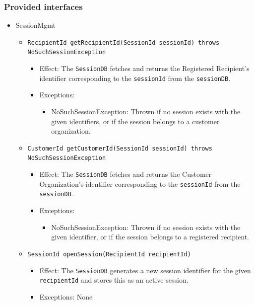 \documentclass[a4paper,10pt]{article}
\begin{document}
\subsubsection*{Provided interfaces}
\begin{itemize}
    \item SessionMgmt
    \begin{itemize}
        \item \texttt{RecipientId getRecipientId(SessionId sessionId) throws NoSuchSessionException}
        \begin{itemize}
            \item Effect: The \texttt{SessionDB} fetches and returns the Registered Recipient's identifier corresponding to the \texttt{sessionId} from the \texttt{sessionDB}.
            \item Exceptions:
            \begin{itemize}
                \item NoSuchSessionException: Thrown if no session exists with the given identifiers, or if the session belongs to a customer organization.
            \end{itemize}
		\end{itemize}
		
        \item \texttt{CustomerId getCustomerId(SessionId sessionId) throws NoSuchSessionException}
        \begin{itemize}
             \item Effect: The \texttt{SessionDB} fetches and returns the Customer Organization's identifier corresponding to the \texttt{sessionId} from the \texttt{sessionDB}.
             \item Exceptions:
             \begin{itemize}
                \item NoSuchSessionException: Thrown if no session exists with the given identifier, or if the session belongs to a registered recipient.
             \end{itemize}
        \end{itemize}
        
        \item \texttt{SessionId openSession(RecipientId recipientId)}
        \begin{itemize}
             \item Effect: The \texttt{SessionDB} generates a new session identifier for the given \texttt{recipientId} and stores this as an active session.
             \item Exceptions: None
        \end{itemize}


\end{itemize}
\end{itemize}
\end{document}
